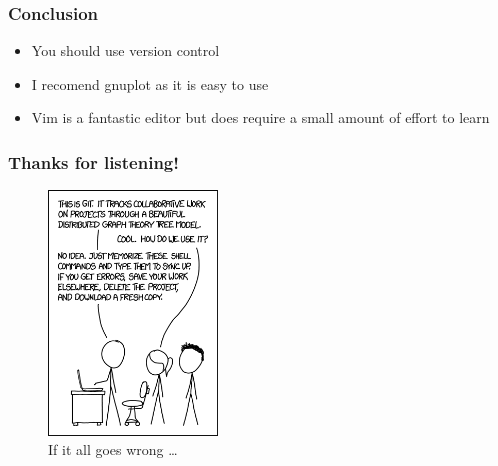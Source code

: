 \documentclass{beamer}
\begin{document}
\begin{frame}
    \frametitle{Conclusion}
    \begin{itemize}
    \item You should use version control
    \item I recomend gnuplot as it is easy to use
    \item Vim is a fantastic editor but does require a small amount of effort to learn
    \end{itemize}
\end{frame}


\begin{frame}
\frametitle{Thanks for listening!}
\begin{figure}[H]
	\centering
	\includegraphics[width=0.4\textwidth]{xkcdgit.png}
	\caption{If it all goes wrong \ldots \footnotemark }
	\label{fig:xkcdversion}
\end{figure}
\end{frame}
\end{document}
